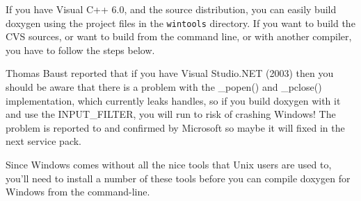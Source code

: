 If you have Visual C++ 6.0, and the source distribution, you can easily build doxygen using the project files in the {\tt wintools} directory. If you want to build the CVS sources, or want to build from the command line, or with another compiler, you have to follow the steps below.

Thomas Baust reported that if you have Visual Studio.NET (2003) then you should be aware that there is a problem with the \_\-popen() and \_\-pclose() implementation, which currently leaks handles, so if you build doxygen with it and use the INPUT\_\-FILTER, you will run to risk of crashing Windows! The problem is reported to and confirmed by Microsoft so maybe it will fixed in the next service pack.

Since Windows comes without all the nice tools that Unix users are used to, you'll need to install a number of these tools before you can compile doxygen for Windows from the command-line.

